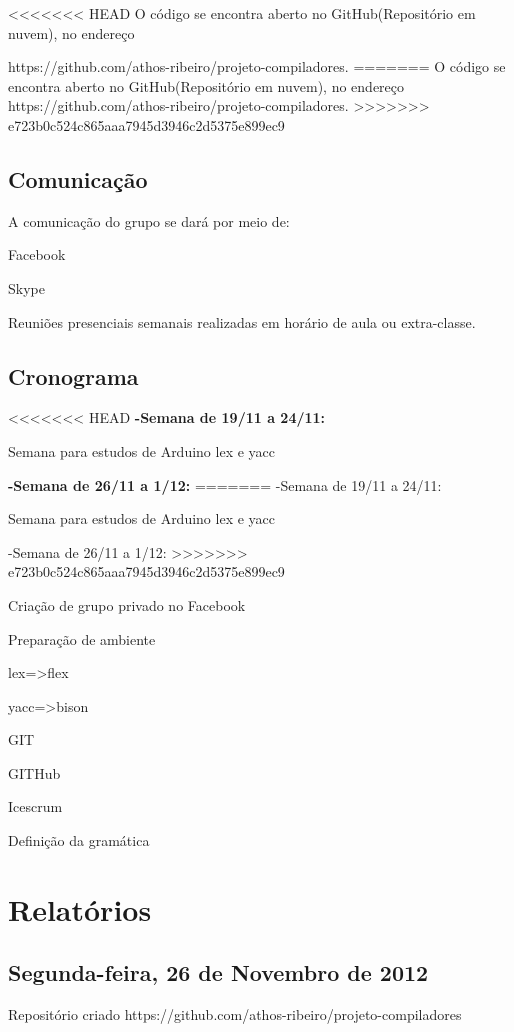 \documentclass{abnt}
\begin{document}
<<<<<<< HEAD
O código se encontra aberto no GitHub(Repositório em nuvem), no endereço

 https://github.com/athos-ribeiro/projeto-compiladores.
=======
O código se encontra aberto no GitHub(Repositório em nuvem), no endereço https://github.com/athos-ribeiro/projeto-compiladores.
>>>>>>> e723b0c524c865aaa7945d3946c2d5375e899ec9

\section{Comunicação}
    A comunicação do grupo se dará por meio de:

    Facebook

    Skype

    Reuniões presenciais semanais realizadas em horário de aula ou extra-classe.

\section{Cronograma}
<<<<<<< HEAD
\textbf{-Semana de 19/11 a 24/11:}

         Semana para estudos de Arduino lex e yacc

         \textbf{-Semana de 26/11 a 1/12:}
=======
    -Semana de 19/11 a 24/11:

         Semana para estudos de Arduino lex e yacc

    -Semana de 26/11 a 1/12:
>>>>>>> e723b0c524c865aaa7945d3946c2d5375e899ec9

         Criação de grupo privado no Facebook

         Preparação de ambiente

             lex=>flex

             yacc=>bison

             GIT

             GITHub

             Icescrum

         Definição da gramática

\chapter{Relatórios}
\section{Segunda-feira, 26 de Novembro de 2012}
Repositório criado
    https://github.com/athos-ribeiro/projeto-compiladores
\end{document}
